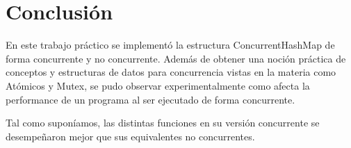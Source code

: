 \section{Conclusión}
En este trabajo práctico se implementó la estructura ConcurrentHashMap de forma concurrente y no concurrente.
Además de obtener una noción práctica de conceptos y estructuras de datos para concurrencia vistas en la materia como Atómicos y Mutex, se pudo observar experimentalmente como afecta la performance de un programa al ser ejecutado de forma concurrente.

Tal como suponíamos, las distintas funciones en su versión concurrente se desempeñaron mejor que sus equivalentes no concurrentes.

